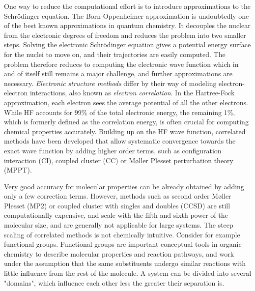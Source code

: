 One way to reduce the computational effort is to introduce approximations to the Schrödinger equation. The Born-Oppenheimer approximation  is undoubtedly one of the best known approximations in quantum chemistry. It decouples the nuclear from the electronic degrees of freedom and reduces the problem into two smaller steps. Solving the electronic Schrödinger equation gives a potential energy surface for the nuclei to move on, and their trajectories are easily computed. The problem therefore reduces to computing the electronic wave function which in and of itself still remains a major challenge, and further approximations are necessary. \emph{Electronic structure methods} differ by their way of modeling electron-electron interactions, also known as \emph{electron correlation}. In the Hartree-Fock approximation, each electron sees the average potential of all the other electrons. While HF accounts for 99\% of the total electronic energy, the remaining 1\%, which is formerly defined as the correlation energy, is often crucial for computing chemical properties accurately. Building up on the HF wave function, correlated methods have been developed that allow systematic convergence towards the exact wave function by adding higher order terms, such as configuration interaction (CI), coupled cluster (CC) or M{\o}ller Plesset perturbation theory (MPPT). 

Very good accuracy for molecular properties can be already obtained by adding only a few correction terms. However, methods such as second order M{\o}ller Plesset (MP2) or coupled cluster with singles and doubles (CCSD) are still computationally expensive, and scale with the fifth and sixth power of the molecular size, and are generally not applicable for large systems. The steep scaling of correlated methods is not chemically intuitive. Consider for example functional groups. Functional groups are important conceptual tools in organic chemistry to describe molecular properties and reaction pathways, and work under the assumption that the same substituents undergo similar reactions with little influence from the rest of the molecule. A system can be divided into several "domains", which influence each other less the greater their separation is. 

